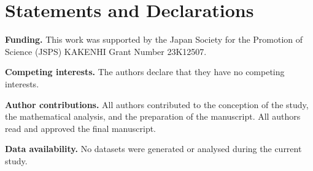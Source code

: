 \documentclass[11pt]{article}
\theoremstyle{remark}
\numberwithin{equation}{section}
\begin{document}
\section*{Statements and Declarations}

\noindent\textbf{Funding.}
This work was supported by the Japan Society for the Promotion of Science
(JSPS) KAKENHI Grant Number 23K12507.

\medskip
\noindent\textbf{Competing interests.}
The authors declare that they have no competing interests.

\medskip
\noindent\textbf{Author contributions.}
All authors contributed to the conception of the study, the mathematical
analysis, and the preparation of the manuscript. All authors read and approved
the final manuscript.

\medskip
\noindent\textbf{Data availability.}
No datasets were generated or analysed during the current study.
\end{document}
